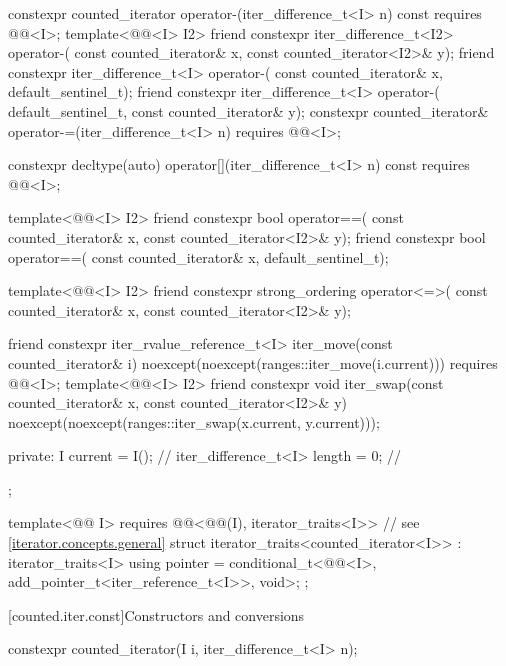 \begin{codeblock}
{{    constexpr counted_iterator operator-(iter_difference_t<I> n) const
      requires @@<I>;
    template<@@<I> I2>
      friend constexpr iter_difference_t<I2> operator-(
        const counted_iterator& x, const counted_iterator<I2>& y);
    friend constexpr iter_difference_t<I> operator-(
      const counted_iterator& x, default_sentinel_t);
    friend constexpr iter_difference_t<I> operator-(
      default_sentinel_t, const counted_iterator& y);
    constexpr counted_iterator& operator-=(iter_difference_t<I> n)
      requires @@<I>;

    constexpr decltype(auto) operator[](iter_difference_t<I> n) const
      requires @@<I>;

    template<@@<I> I2>
      friend constexpr bool operator==(
        const counted_iterator& x, const counted_iterator<I2>& y);
    friend constexpr bool operator==(
      const counted_iterator& x, default_sentinel_t);

    template<@@<I> I2>
      friend constexpr strong_ordering operator<=>(
        const counted_iterator& x, const counted_iterator<I2>& y);

    friend constexpr iter_rvalue_reference_t<I> iter_move(const counted_iterator& i)
      noexcept(noexcept(ranges::iter_move(i.current)))
        requires @@<I>;
    template<@@<I> I2>
      friend constexpr void iter_swap(const counted_iterator& x, const counted_iterator<I2>& y)
        noexcept(noexcept(ranges::iter_swap(x.current, y.current)));

  private:
    I current = I();                    // \expos
    iter_difference_t<I> length = 0;    // \expos
  };

  template<@@ I>
    requires @@<@@(I), iterator_traits<I>>   // see \ref{iterator.concepts.general}
  struct iterator_traits<counted_iterator<I>> : iterator_traits<I> {
    using pointer = conditional_t<@@<I>,
                                  add_pointer_t<iter_reference_t<I>>, void>;
  };
}
\end{codeblock}

[counted.iter.const]{Constructors and conversions}

%
\begin{itemdecl}
constexpr counted_iterator(I i, iter_difference_t<I> n);
\end{itemdecl}

